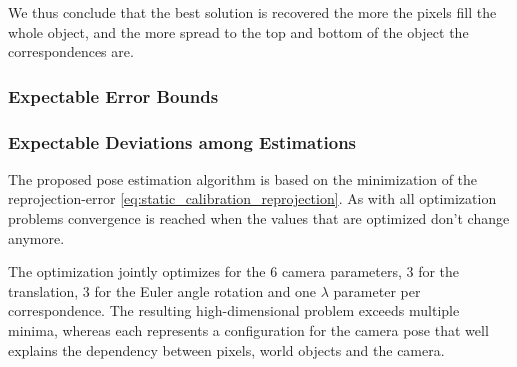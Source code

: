 We thus conclude that the best solution is recovered the more the pixels fill the whole object, and the more spread to the top and bottom of the object the correspondences are. 




























\subsubsection{Expectable Error Bounds}
\label{sec:static_calibration_expectable_error}



































\subsubsection{Expectable Deviations among Estimations}
The proposed pose estimation algorithm is based on the minimization of the reprojection-error \autoref{eq:static_calibration_reprojection}.
As with all optimization problems convergence is reached when the values that are optimized don't change anymore.

The optimization jointly optimizes for the 6 camera parameters, 3 for the translation, 3 for the Euler angle rotation and one $\lambda$ parameter per correspondence.
The resulting high-dimensional problem exceeds multiple minima, whereas each represents a configuration for the camera pose that well explains the dependency between pixels, world objects and the camera. 

